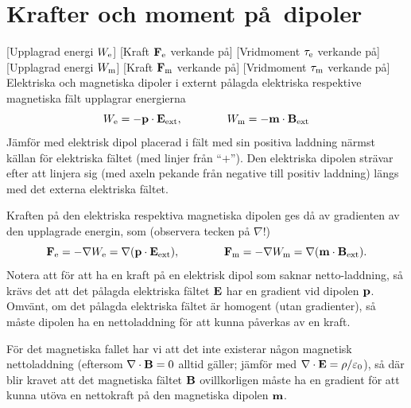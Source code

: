 \section{Krafter och moment p{\aa}\ dipoler}
[Upplagrad energi $W_{\rm e}$]
[Kraft ${\bf F}_{\rm e}$ verkande p{\aa}]
[Vridmoment $\tau_{\rm e}$ verkande p{\aa}]
[Upplagrad energi $W_{\rm m}$]
[Kraft ${\bf F}_{\rm m}$ verkande p{\aa}]
[Vridmoment $\tau_{\rm m}$ verkande p{\aa}]
Elektriska och magnetiska dipoler i externt p{\aa}lagda elektriska respektive
magnetiska f{\"a}lt upplagrar energierna
$$
  W_{\rm e} = -{\bf p}\cdot{\bf E}_{\rm ext},\qquad\qquad
  W_{\rm m} = -{\bf m}\cdot{\bf B}_{\rm ext}
$$
J{\"a}mf{\"o}r med elektrisk dipol placerad i f{\"a}lt med sin positiva
laddning n{\"a}rmst k{\"a}llan f{\"o}r elektriska f{\"a}ltet (med linjer
fr{\aa}n ``$+$''). Den elektriska dipolen str{\"a}var efter att linjera sig
(med axeln pekande fr{\aa}n negative till positiv laddning) l{\"a}ngs med
det externa elektriska f{\"a}ltet.

Kraften p{\aa} den elektriska respektiva magnetiska dipolen ges d{\aa} av
gradienten av den upplagrade energin, som (observera tecken p{\aa} $\nabla$!)%
$$
  {\bf F}_{\rm e} = -\nabla W_{\rm e}
    =\nabla({\bf p}\cdot{\bf E}_{\rm ext}),\qquad\qquad
  {\bf F}_{\rm m} = -\nabla W_{\rm m}
    =\nabla({\bf m}\cdot{\bf B}_{\rm ext}).
$$
Notera att f{\"o}r att ha en kraft p{\aa} en elektrisk dipol som saknar
netto-laddning, s{\aa} kr{\"a}vs det att det p{\aa}lagda elektriska f{\"a}ltet
${\bf E}$ har en gradient vid dipolen ${\bf p}$. Omv{\"a}nt, om det p{\aa}lagda
elektriska f{\"a}ltet {\"a}r homogent (utan gradienter), s{\aa} m{\aa}ste
dipolen ha en nettoladdning f{\"o}r att kunna p{\aa}verkas av en kraft.

F{\"o}r det magnetiska fallet har vi att det inte existerar n{\aa}gon magnetisk
nettoladdning (eftersom $\nabla\cdot{\bf B}=0$ alltid g{\"a}ller;
j{\"a}mf{\"o}r med $\nabla\cdot{\bf E}=\rho/\varepsilon_0$), s{\aa} d{\"a}r
blir kravet att det magnetiska f{\"a}ltet ${\bf B}$ ovillkorligen m{\aa}ste ha
en gradient f{\"o}r att kunna ut{\"o}va en nettokraft p{\aa} den magnetiska
dipolen ${\bf m}$.

